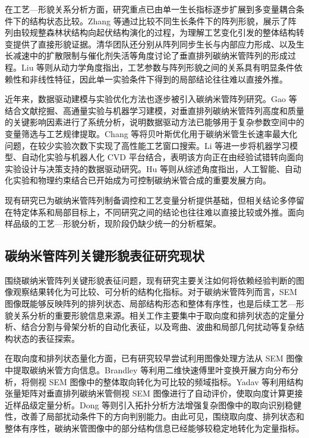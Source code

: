 在工艺—形貌关系分析方面，研究重点已由单一生长指标逐步扩展到多变量耦合条件下的结构状态比较。Zhang 等\cite{Zhang2009Morphology}通过比较不同生长条件下的阵列形貌，展示了阵列由较规整森林状结构向起伏结构演化的过程，为理解工艺变化引发的整体结构转变提供了直接形貌证据。清华团队还分别从阵列同步生长与内部应力形成\cite{Zhang2007SynchronousGrowthVACNT}、以及生长减速中的扩散限制与催化剂失活\cite{Xiang2008GrowthDecelerationVACNT}等角度讨论了垂直排列碳纳米管阵列的形成过程。Liu 等\cite{Liu2021EcoMat}则从动力学角度指出，工艺参数与阵列形貌之间的关系具有明显条件依赖性和非线性特征，因此单一实验条件下得到的局部结论往往难以直接外推。

近年来，数据驱动建模与实验优化方法也逐步被引入碳纳米管阵列研究。Gao 等\cite{Gao2023}结合文献挖掘、高通量实验与机器学习建模，对垂直排列碳纳米管阵列高度和质量的关键影响因素进行了系统分析，说明数据驱动方法已能够用于复杂参数空间中的变量筛选与工艺规律提取。Chang 等\cite{Chang2020}将贝叶斯优化用于碳纳米管生长速率最大化问题，在较少实验次数下实现了高性能工艺窗口搜索。Li 等\cite{Li2025Matter}进一步将机器学习模型、自动化实验与机器人化 CVD 平台结合，表明该方向正在由经验试错转向面向实验设计与决策支持的数据驱动研究。Hu 等\cite{Hu2026AICNTSynthesis}则从综述角度指出，人工智能、自动化实验和物理约束结合已开始成为可控制碳纳米管合成的重要发展方向。

现有研究已为碳纳米管阵列制备调控和工艺变量分析提供基础，但相关结论多停留在特定体系和局部目标上，不同研究之间的结论也往往难以直接比较或外推。面向样品级的工艺—形貌分析，现阶段仍缺少统一的分析框架。

\subsection{碳纳米管阵列关键形貌表征研究现状}

围绕碳纳米管阵列关键形貌表征问题，现有研究主要关注如何将依赖经验判断的图像观察结果转化为可比较、可分析的结构化指标。对于碳纳米管阵列而言，SEM 图像既能够反映阵列的排列状态、局部结构形态和整体有序性，也是后续工艺—形貌关系分析的重要形貌信息来源。相关工作主要集中于取向度和排列状态的定量分析、结合分割与骨架分析的自动化表征，以及弯曲、波曲和局部几何扰动等复杂结构状态的表征探索。

在取向度和排列状态量化方面，已有研究较早尝试利用图像处理方法从 SEM 图像中提取碳纳米管方向信息。Brandley 等\cite{Brandley2018}利用二维快速傅里叶变换开展方向分布分析，将侧视 SEM 图像中的整体取向转化为可比较的频域指标。Yadav 等\cite{Yadav2024}利用结构张量矩阵对垂直排列碳纳米管侧视 SEM 图像进行了自动评价，使取向度计算更接近样品级定量分析。Dong 等\cite{Dong2022TDA}则引入拓扑分析方法增强复杂图像中的取向识别稳健性，改善了局部扰动条件下的方向判别能力。由此可见，围绕取向度、排列状态和整体有序性，碳纳米管图像中的部分结构信息已经能够较稳定地转化为定量指标。


